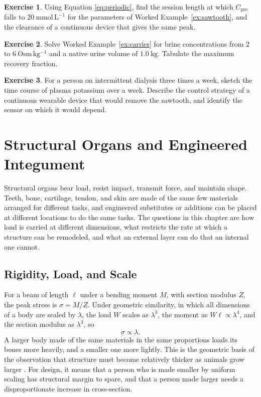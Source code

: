 \documentclass[11pt,openany]{book}
\theoremstyle{definition}
\newtheorem{exercise}{Exercise}[chapter]
\theoremstyle{remark}
\begin{document}
\begin{exercise}
Using Equation \eqref{eq:periodic}, find the session length at which $C_{\mathrm{pre}}$ falls to $20\ \mathrm{mmol\,L^{-1}}$ for the parameters of Worked Example~\ref{ex:sawtooth}, and the clearance of a continuous device that gives the same peak.
\end{exercise}

\begin{exercise}
Solve Worked Example~\ref{ex:carrier} for brine concentrations from $2$ to $6\ \mathrm{Osm\,kg^{-1}}$ and a native urine volume of $1.0\ \mathrm{kg}$. Tabulate the maximum recovery fraction.
\end{exercise}

\begin{exercise}
For a person on intermittent dialysis three times a week, sketch the time course of plasma potassium over a week. Describe the control strategy of a continuous wearable device that would remove the sawtooth, and identify the sensor on which it would depend.
\end{exercise}

\chapter{Structural Organs and Engineered Integument}
\label{ch:structure}

Structural organs bear load, resist impact, transmit force, and maintain shape. Teeth, bone, cartilage, tendon, and skin are made of the same few materials arranged for different tasks, and engineered substitutes or additions can be placed at different locations to do the same tasks. The questions in this chapter are how load is carried at different dimensions, what restricts the rate at which a structure can be remodeled, and what an external layer can do that an internal one cannot.

\section{Rigidity, Load, and Scale}

For a beam of length $\ell$ under a bending moment $M$, with section modulus $Z$, the peak stress is $\sigma=M/Z$. Under geometric similarity, in which all dimensions of a body are scaled by $\lambda$, the load $W$ scales as $\lambda^{3}$, the moment as $W\ell\propto\lambda^{4}$, and the section modulus as $\lambda^{3}$, so
\begin{equation}
\sigma\propto\lambda.
\label{eq:stressscale}
\end{equation}
A larger body made of the same materials in the same proportions loads its bones more heavily, and a smaller one more lightly. This is the geometric basis of the observation that structure must become relatively thicker as animals grow larger \cite{schmidtnielsen1984}. For design, it means that a person who is made smaller by uniform scaling has structural margin to spare, and that a person made larger needs a disproportionate increase in cross-section.
\end{document}
